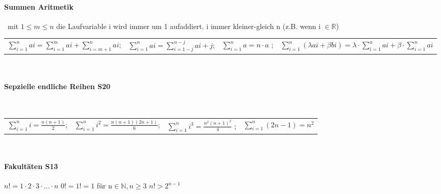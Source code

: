 \paragraph{Summen Aritmetik}\
mit $1\leq m\leq n$  \qquad die  Laufvariable i wird immer um 1 aufaddiert. i immer kleiner-gleich n (z.B. wenn i $\in \mathbb R $)\\

\begin{tabulary}{15cm}{|l|c|c|r|}
	$ \sum\limits_{i = 1}^{n}ai = \sum\limits_{i = 1}^{m}ai + \sum\limits_{i = m+1}^{n}ai  $;\qquad	&	
	$ \sum\limits_{i = 1}^{n}ai = \sum\limits_{i = 1-j}^{n-j}ai+j  $;\qquad	& 
	$ \sum\limits_{i = 1}^{n}a = n \cdot a  $ ;	\qquad	&
	$ \sum\limits_{i = 1}^{n}(\lambda ai+\beta bi) = \lambda\cdot \sum\limits_{i = 1}^{n}ai + \beta\cdot \sum\limits_{i = 1}^{n}ai  $ \qquad \\

\end{tabulary}\\






\paragraph{Sepzielle endliche Reihen \color{red} S20}\


\begin{tabulary}{15cm}{Lccr}
	$ \sum\limits_{i = 1}^{n}i = \frac{n(n+1)}{2}  $; \qquad	&	
	$ \sum\limits_{i = 1}^{n}i^{2} = \frac{n(n+1)(2n+1)}{6}  $;\qquad	& 
	$ \sum\limits_{i = 1}^{n}i^{3} = \frac{n^{2}(n+1)^{2}}{4}  $ ;	\qquad	&
	$ \sum\limits_{i = 1}^{n}(2n-1) = n^{2}  $\qquad\qquad \\
	
\end{tabulary}\\



\paragraph{Fakultäten \color{red} S13} %
\label{par:fakultaeten}
$n! = 1 \cdot 2 \cdot 3 \cdot \ldots \cdot n$ \qquad  $0! = 1! = 1$ \qquad\qquad  für n$\in \mathbb N, n\geq3$ \qquad\qquad $ n! > 2^{n-1}$  \\

